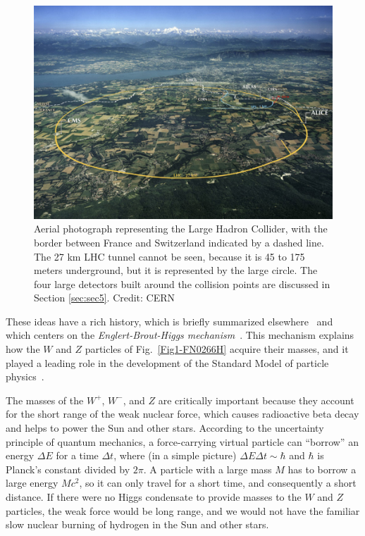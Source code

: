 \documentclass[12pt]{iopart}
\begin{document}
\begin{figure}[htbp] 
\centering
 \includegraphics[bb=0 0 360 285, width=5in]{Fig2-lhc-aerial.eps}
 \caption{Aerial photograph representing the Large Hadron Collider, with the border between France and Switzerland indicated by a dashed line. The 27 km LHC tunnel cannot be seen, because it is 45 to 175 meters underground, but it is represented by the large circle. The four large detectors built around the collision points are discussed in Section \ref{sec:sec5}. Credit: CERN \label{Fig2-8701973.eps}}
 \end{figure}

These ideas have a rich history, which is briefly summarized elsewhere~\cite{Allen-EBH} and which centers on the \textit{Englert-Brout-Higgs mechanism}~\cite{London,Anderson,Englert,Higgs1,Higgs2,Kibble}. This mechanism explains how the $W$ and $Z$ particles of Fig.~\ref{Fig1-FN0266H} acquire their masses, and it played a leading role in the development of the Standard Model of particle physics~\cite{Weinberg,Salam}.

The masses of the $W^+$, $W^-$, and $Z$ are critically important because they account for the short range of the weak nuclear force, which causes radioactive beta decay and helps to power the Sun and other stars. According to the uncertainty principle of quantum mechanics, a force-carrying virtual particle can ``borrow'' an energy $\Delta E$ for a time $\Delta t$, where (in a simple picture) $\Delta E \Delta t \sim \hbar$ and $\hbar$ is Planck's constant divided by $2 \pi$. A particle with a large mass $M$ has to borrow  a large energy $Mc^2$, so it can only travel for a short time, and consequently a short distance. If there were no Higgs condensate to provide masses to the $W$ and $Z$ particles, the weak force would be long range, and we would not have the familiar slow nuclear burning of hydrogen in the Sun and other stars.
\end{document}
